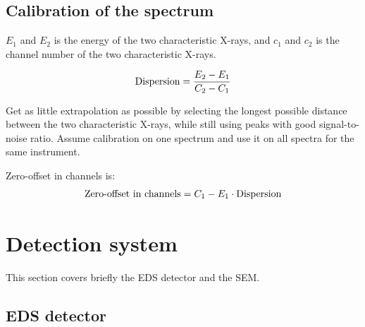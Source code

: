 %
\subsection{Calibration of the spectrum}
\label{sec:theory:calibration}




$E_1$ and $E_2$ is the energy of the two characteristic X-rays, and $c_1$ and $c_2$ is the channel number of the two characteristic X-rays.

\begin{equation}
    \label{eq:theory:calibration:dispersion}
    \textnormal{Dispersion} = \frac{E_2 - E_1}{C_2 - C_1}
\end{equation}

Get as little extrapolation as possible by selecting the longest possible distance between the two characteristic X-rays, while still using peaks with good signal-to-noise ratio.
Assume calibration on one spectrum and use it on all spectra for the same instrument.


Zero-offset in channels is:
\begin{equation}
    \label{eq:theory:calibration:offset}
    \textnormal{Zero-offset in channels} = C_1 - E_1 \cdot \textnormal{Dispersion}
\end{equation}
















\section{Detection system}
\label{sec:theory:detectionsystem}

This section covers briefly the EDS detector and the SEM.


\subsection{EDS detector}
\label{sec:theory:edsdetector}


